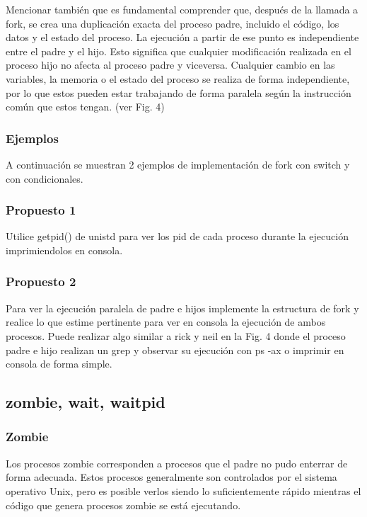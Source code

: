 \documentclass[journal]{IEEEtai}
\begin{document}
Mencionar también que es fundamental comprender que, después de la llamada a fork, se crea una duplicación exacta del proceso padre, incluido el código, los datos y el estado del proceso. La ejecución a partir de ese punto es independiente entre el padre y el hijo. Esto significa que cualquier modificación realizada en el proceso hijo no afecta al proceso padre y viceversa. Cualquier cambio en las variables, la memoria o el estado del proceso se realiza de forma independiente, por lo que estos pueden estar trabajando de forma paralela según la instrucción común que estos tengan. (ver Fig. 4)

\subsubsection{\textbf{Ejemplos}} A continuación se muestran 2 ejemplos de implementación de fork con switch y con condicionales.
 

 

  
\subsubsection{\textbf{Propuesto 1}} Utilice getpid() de unistd para ver los pid de cada proceso durante la ejecución imprimiendolos en consola.

\subsubsection{\textbf{Propuesto 2}} Para ver la ejecución paralela de padre e hijos implemente la estructura de fork y realice lo que estime pertinente para ver en consola la ejecución de ambos procesos. Puede realizar algo similar a rick y neil en la Fig. 4 donde el proceso padre e hijo realizan un grep y observar su ejecución con ps -ax o imprimir en consola de forma simple.

\subsection{zombie, wait, waitpid}

\subsubsection{Zombie} Los procesos zombie corresponden a procesos que el padre no pudo enterrar de forma adecuada. Estos procesos generalmente son controlados por el sistema operativo Unix, pero es posible verlos siendo lo suficientemente rápido mientras el código que genera procesos zombie se está ejecutando.
\end{document}
